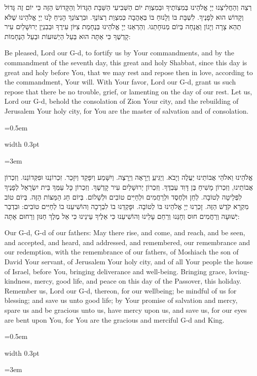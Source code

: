 \documentclass[11pt, openany]{book}
\newlength{\bidiHebWidth}
\newlength{\bidiEngWidth}
\newenvironment{bilingual}{%
  \par\vspace{4pt}%
}{%
  \noindent
  \begin{minipage}[t]{\bidiEngWidth}
    \setstretch{1.4}\emergencystretch=0.5em\normalsize
    \usebox{\bidiEngBox}
  \end{minipage}%
  \hfill
  {\color{sedergold}\vrule width 0.3pt}%
  \hfill
  \begin{minipage}[t]{\bidiHebWidth}
    \begingroup\hebrewfont\TeXXeTstate=1\beginR
    \large\setstretch{1.4}\emergencystretch=3em\tolerance=9999\parindent=0pt\relax
    \usebox{\bidiHebBox}
    \endR\endgroup
  \end{minipage}%
  \par\vspace{2pt}%
}
\newenvironment{hebrewcol}{%
  \begin{lrbox}{\bidiHebBox}\begin{minipage}{\bidiHebWidth}%
}{%
  \end{minipage}\end{lrbox}%
}
\newenvironment{englishcol}{%
  \begin{lrbox}{\bidiEngBox}\begin{minipage}{\bidiEngWidth}%
}{%
  \end{minipage}\end{lrbox}%
}
\newenvironment{shabbatadd}{%
  \par\vspace{3pt}
  \begin{tcolorbox}[
    enhanced,
    breakable,
    colback=sederblue!6,
    colframe=sederblue!6,
    boxrule=0pt,
    left=10pt,
    right=10pt,
    top=6pt,
    bottom=6pt,
    borderline north={0.5pt}{0pt}{sederblue!25},
    borderline south={0.5pt}{0pt}{sederblue!25},
    arc=0pt,
    outer arc=0pt,
    before upper={\small\textcolor{sederblue}{\textit{On Shabbat add:}}\par\vspace{2pt}},
  ]
}{%
  \end{tcolorbox}
  \par\vspace{3pt}
}
\begin{document}
\begin{shabbatadd}
\begin{bilingual}
\begin{hebrewcol}
רְצֵה וְהַחֲלִיצֵנוּ יְיָ אֱלֹהֵינוּ בְּמִצְוֹתֶיךָ וּבְמִצְוַת יוֹם הַשְּׁבִיעִי הַשַּׁבָּת הַגָּדוֹל וְהַקָּדוֹשׂ הַזֶּה כִּי יוֹם זֶה גָּדוֹל וְקָדוֹשׁ הוּא לְפָנֶיךָ. לִשְׁבָּת בּוֹ וְלָנוּחַ בּוֹ בְּאַהֲבָה כְּמִצְוַת רְצוֹנֶךָ. וּבִרְצוֹנְךָ הָנִיחַ לָנוּ יְיָ אֱלֹהֵינוּ שֶׁלֹּא תְהֵא צָרָה וְיָגוֹן וַאֲנָחָה בְּיוֹם מְנוּחָתֵנוּ. וְהַרְאֵנוּ יְיָ אֱלֹהֵינוּ בְּנֶחָמַת צִיּוֹן עִירֶךָ וּבְבִנְיַן יְרוּשָׁלַיִם עִיר קָדְשֶׁךָ כִּי אַתָּה הוּא בַּעַל הַיְשׁוּעוֹת וּבַעַל הַנֶּחָמוֹת:
\end{hebrewcol}
\begin{englishcol}
Be pleased, Lord our G-d, to fortify us by Your commandments, and by the commandment of the seventh day, this great and holy Shabbat, since this day is great and holy before You, that we may rest and repose then in love, according to the commandment, Your will. With Your favor, Lord our G-d, grant us such repose that there be no trouble, grief, or lamenting on the day of our rest. Let us, Lord our G-d, behold the consolation of Zion Your city, and the rebuilding of Jerusalem Your holy city, for You are the master of salvation and of consolation.
\end{englishcol}
\end{bilingual}
\end{shabbatadd}
\begin{bilingual}
\begin{hebrewcol}
אֱלֹהֵינוּ וֵאלֹהֵי אֲבוֹתֵינוּ יַעֲלֶה וְיָבֹא. וְיַגִּיעַַ וְיֵרָאֶה וְיֵרָצֶה. וְיִשָּׁמַע וְיִפָּקֵד וְיִזָּכֵר. זִכְרוֹנֵנוּ וּפִקְּדוֹנֵנוּ. וְזִכְרוֹן אֲבוֹתֵינוּ, וְזִכְרוֹן מָשִׁיחַ בֶּן דָּוִד עַבְדֶּךָ. וְזִכְרוֹן יְרוּשָׁלַיִם עִיר קָדְשֶׁךָ. וְזִכְרוֹן כָּל עַמְּךָ בֵּית יִשְׂרָאֵל לְפָנֶיךָ לִפְלֵיטָה לְטוֹבָה. לְחֵן וּלְחֶסֶד וּלְרַחֲמִים וּלְחַיִּים טוֹבִים וּלְשָׁלוֹם. בְּיוֹם חַג הַמַּצּוֹת הַזֶּה. בְּיוֹם טוֹב מִקְרָא קֹדֶשׁ הַזֶּה. זָכְרֵנוּ יְיָ אֱלֹהֵינוּ בּוֹ לְטוֹבָה. וּפָקְדֵנוּ בוֹ לִבְרָכָה וְהוֹשִׁיעֵנוּ בוֹ לְחַיִּים טוֹבִים: וּבִדְבַר יְשׁוּעָה וְרַחֲמִים חוּס וְחָנֵּנוּ וְרַחֵם עָלֵינוּ וְהוֹשִׁיעֵנוּ כִּי אֵלֶיךָ עֵינֵינוּ כִּי אֵל מֶלֶךְ חַנּוּן וְרַחוּם אָתָּה:
\end{hebrewcol}
\begin{englishcol}
Our G-d, G-d of our fathers: May there rise, and come, and reach, and be seen, and accepted, and heard, and addressed, and remembered, our remembrance and our redemption, with the remembrance of our fathers, of Moshiach the son of David Your servant, of Jerusalem Your holy city, and of all Your people the house of Israel, before You, bringing deliverance and well-being. Bringing grace, loving-kindness, mercy, good life, and peace on this day of the Passover, this holiday. Remember us, Lord our G-d, thereon, for our wellbeing; be mindful of us for blessing; and save us unto good life; by Your promise of salvation and mercy, spare us and be gracious unto us, have mercy upon us, and save us, for our eyes are bent upon You, for You are the gracious and merciful G-d and King.
\end{englishcol}
\end{bilingual}
\end{document}
